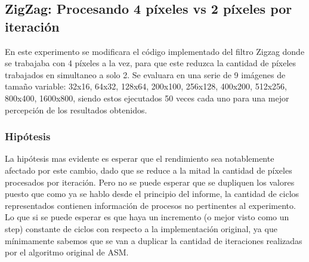 \documentclass[a4paper]{article}
\begin{document}
\subsection{ZigZag: Procesando 4 píxeles vs 2 píxeles por iteración}
En este experimento se modificara el código implementado del filtro Zigzag donde se trabajaba con 4 píxeles a la vez, para que este reduzca la cantidad de píxeles trabajados en simultaneo a solo 2.
Se evaluara en una serie de 9 imágenes de tamaño variable: 32x16, 64x32, 128x64, 200x100, 256x128, 400x200, 512x256, 800x400, 1600x800, siendo estos ejecutados 50 veces cada uno para una mejor percepción de los resultados obtenidos.

\subsubsection{Hipótesis}
La hipótesis mas evidente es esperar que el rendimiento sea notablemente afectado por este cambio, dado que se reduce a la mitad la cantidad de píxeles procesados por iteración. Pero no se puede esperar que se dupliquen los valores puesto que como ya se hablo desde el principio del informe, la cantidad de ciclos representados contienen información de procesos no pertinentes al experimento. Lo que si se puede esperar es que haya un incremento (o mejor visto como un step) constante de ciclos con respecto a la implementación original, ya que mínimamente sabemos que se van a duplicar la cantidad de iteraciones realizadas por el algoritmo original de ASM.
\end{document}
